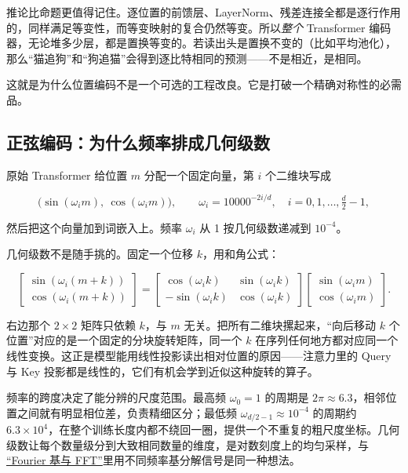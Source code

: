 推论比命题更值得记住。逐位置的前馈层、LayerNorm、残差连接全都是逐行作用的，同样满足等变性，而等变映射的复合仍然等变。所以\emph{整个} Transformer 编码器，无论堆多少层，都是置换等变的。若读出头是置换不变的（比如平均池化），那么``猫追狗''和``狗追猫''会得到逐比特相同的预测——不是相近，是相同。

这就是为什么位置编码不是一个可选的工程改良。它是打破一个精确对称性的必需品。

\subsection{正弦编码：为什么频率排成几何级数}

原始 Transformer 给位置 \(m\) 分配一个固定向量，第 \(i\) 个二维块写成

\[
\bigl(\sin(\omega_i m),\ \cos(\omega_i m)\bigr),
\qquad
\omega_i = 10000^{-2i/d},\quad i=0,1,\ldots,\tfrac{d}{2}-1,
\]

然后把这个向量加到词嵌入上。频率 \(\omega_i\) 从 1 按几何级数递减到 \(10^{-4}\)。

几何级数不是随手挑的。固定一个位移 \(k\)，用和角公式：

\[
\begin{bmatrix}\sin(\omega_i(m+k))\\ \cos(\omega_i(m+k))\end{bmatrix}
=
\begin{bmatrix}\cos(\omega_i k) & \sin(\omega_i k)\\ -\sin(\omega_i k) & \cos(\omega_i k)\end{bmatrix}
\begin{bmatrix}\sin(\omega_i m)\\ \cos(\omega_i m)\end{bmatrix}.
\]

右边那个 \(2\times 2\) 矩阵只依赖 \(k\)，与 \(m\) 无关。把所有二维块摞起来，``向后移动 \(k\) 个位置''对应的是一个固定的分块旋转矩阵，同一个 \(k\) 在序列任何地方都对应同一个线性变换。这正是模型能用线性投影读出相对位置的原因——注意力里的 Query 与 Key 投影都是线性的，它们有机会学到近似这种旋转的算子。

频率的跨度决定了能分辨的尺度范围。最高频 \(\omega_0=1\) 的周期是 \(2\pi\approx 6.3\)，相邻位置之间就有明显相位差，负责精细区分；最低频 \(\omega_{d/2-1}\approx10^{-4}\) 的周期约 \(6.3\times10^4\)，在整个训练长度内都不绕回一圈，提供一个不重复的粗尺度坐标。几何级数让每个数量级分到大致相同数量的维度，是对数刻度上的均匀采样，与 \hyperref[sec:03-Linear-Algebra/08-Complex-Matrices-and-Fourier-Structure/03]{``Fourier 基与 FFT''}里用不同频率基分解信号是同一种想法。

